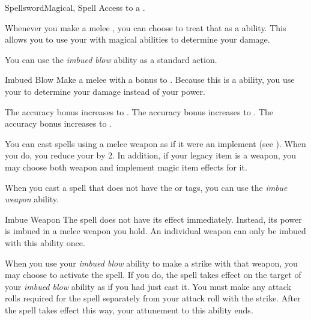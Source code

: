     \begin{feat}{Spellsword}{Magical, Spell}
        \featpre Access to a .

         Whenever you make a melee , you can choose to treat that as a  ability.
        This allows you to use your  with magical abilities to determine your damage.

         You can use the \textit{imbued blow} ability as a standard action.
        \begin{freeability}{Imbued Blow}
            Make a melee  with a  bonus to .
            Because this is a  ability, you use your   to determine your damage instead of your  power.

            \rankline
             The accuracy bonus increases to .
             The accuracy bonus increases to .
             The accuracy bonus increases to .
        \end{freeability}

         You can cast spells using a melee weapon as if it were an implement (see ).
        When you do, you reduce your  by 2.
        In addition, if your legacy item is a weapon, you may choose both weapon and implement magic item effects for it.

         When you cast a spell that does not have the  or  tags,
            you can use the \textit{imbue weapon} ability.
        \begin{attuneability}{Imbue Weapon}
            \rankline
            The spell does not have its effect immediately.
            Instead, its power is imbued in a melee weapon you hold.
            An individual weapon can only be imbued with this ability once.

            When you use your \textit{imbued blow} ability to make a strike with that weapon, you may choose to activate the spell.
            If you do, the spell takes effect on the target of your \textit{imbued blow} ability as if you had just cast it.
            You must make any attack rolls required for the spell separately from your attack roll with the strike.
            After the spell takes effect this way, your attunement to this ability ends.
        \end{attuneability}


\end{feat}
